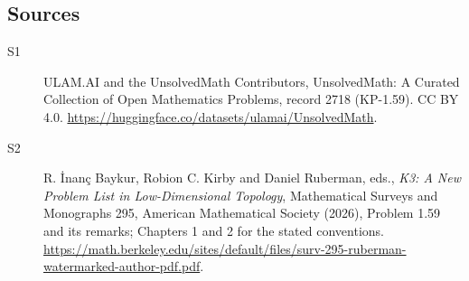 \documentclass[11pt]{article}
\begin{document}
\subsection{Sources}
\begin{description}
\item[\hypertarget{source:2718:1}{S1}] ULAM.AI and the UnsolvedMath Contributors, UnsolvedMath: A Curated Collection of Open Mathematics Problems, record 2718 (KP-1.59). CC BY 4.0. \url{https://huggingface.co/datasets/ulamai/UnsolvedMath}.
\item[\hypertarget{source:2718:2}{S2}] R. İnanç Baykur, Robion C. Kirby and Daniel Ruberman, eds., \emph{K3: A New Problem List in Low-Dimensional Topology}, Mathematical Surveys and Monographs 295, American Mathematical Society (2026), Problem 1.59 and its remarks; Chapters 1 and 2 for the stated conventions. \url{https://math.berkeley.edu/sites/default/files/surv-295-ruberman-watermarked-author-pdf.pdf}.
\end{description}
\label{end:2718}
\end{document}
